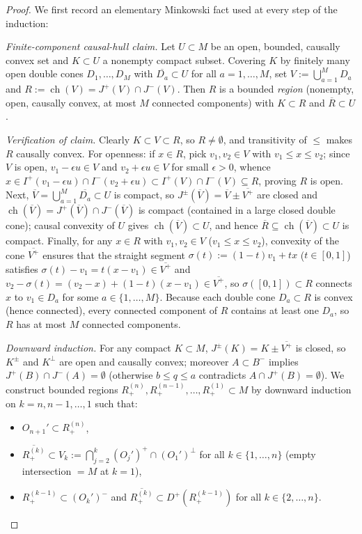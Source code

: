 \documentclass[11pt,a4paper]{article}
\theoremstyle{definition}
\theoremstyle{remark}
\newcommand{\chull}{\operatorname{ch}}
\begin{document}
\begin{proof}
We first record an elementary Minkowski fact used at every step of the induction:

\smallskip\noindent\emph{Finite-component causal-hull claim.}
Let $U\subset M$ be an open, bounded, causally convex set and $K\subset U$ a nonempty compact subset. Covering $K$ by finitely many open double cones $D_1,\dots,D_M$ with $\overline{D_a}\subset U$ for all $a=1,\dots,M$, set $V := \bigcup_{a=1}^M D_a$ and $R := \chull(V) = J^+(V)\cap J^-(V)$. Then $R$ is a bounded \emph{region} (nonempty, open, causally convex, at most $M$ connected components) with $K\subset R$ and $\overline{R}\subset U$.

\smallskip\noindent\emph{Verification of claim.}
Clearly $K\subset V\subset R$, so $R\neq\emptyset$, and transitivity of $\le$ makes $R$ causally convex. For openness: if $x\in R$, pick $v_1,v_2\in V$ with $v_1\le x\le v_2$; since $V$ is open, $v_1-\epsilon u\in V$ and $v_2+\epsilon u\in V$ for small $\epsilon>0$, whence $x\in I^+(v_1-\epsilon u)\cap I^-(v_2+\epsilon u)\subset I^+(V)\cap I^-(V)\subseteq R$, proving $R$ is open. Next, $\overline{V}=\bigcup_{a=1}^M \overline{D_a}\subset U$ is compact, so $J^\pm(\overline{V})=\overline{V}\pm\overline{V^+}$ are closed and $\chull(\overline{V})=J^+(\overline{V})\cap J^-(\overline{V})$ is compact (contained in a large closed double cone); causal convexity of $U$ gives $\chull(\overline{V})\subset U$, and hence $\overline{R}\subseteq\chull(\overline{V})\subset U$ is compact. Finally, for any $x\in R$ with $v_1,v_2\in V$ ($v_1\le x\le v_2$), convexity of the cone $\overline{V^+}$ ensures that the straight segment $\sigma(t):=(1-t)v_1+tx$ ($t\in[0,1]$) satisfies $\sigma(t)-v_1 = t(x-v_1)\in\overline{V^+}$ and $v_2-\sigma(t) = (v_2-x)+(1-t)(x-v_1)\in\overline{V^+}$, so $\sigma([0,1])\subset R$ connects $x$ to $v_1\in D_a$ for some $a\in\{1,\dots,M\}$. Because each double cone $D_a\subset R$ is convex (hence connected), every connected component of $R$ contains at least one $D_a$, so $R$ has at most $M$ connected components.

\smallskip\noindent\emph{Downward induction.}
For any compact $K\subset M$, $J^\pm(K)=K\pm\overline{V^+}$ is closed, so $K^\pm$ and $K^\perp$ are open and causally convex; moreover $A\subset B^-$ implies $J^+(B)\cap J^-(A)=\emptyset$ (otherwise $b\le q\le a$ contradicts $A\cap J^+(B)=\emptyset$). We construct bounded regions $R_+^{(n)}, R_+^{(n-1)}, \dots, R_+^{(1)}\subset M$ by downward induction on $k=n,n-1,\dots,1$ such that:
\begin{itemize}[leftmargin=*,nosep]
\item $O_{n+1}'\subset R_+^{(n)}$,
\item $\overline{R_+^{(k)}}\subset V_k := \bigcap_{j=2}^k (O_j')^+ \cap (O_1')^\perp$ for all $k\in\{1,\dots,n\}$ (empty intersection $=M$ at $k=1$),
\item $R_+^{(k-1)}\subset (O_k')^-$ and $\overline{R_+^{(k)}}\subset D^+(R_+^{(k-1)})$ for all $k\in\{2,\dots,n\}$.
\end{itemize}


\end{proof}
\end{document}
